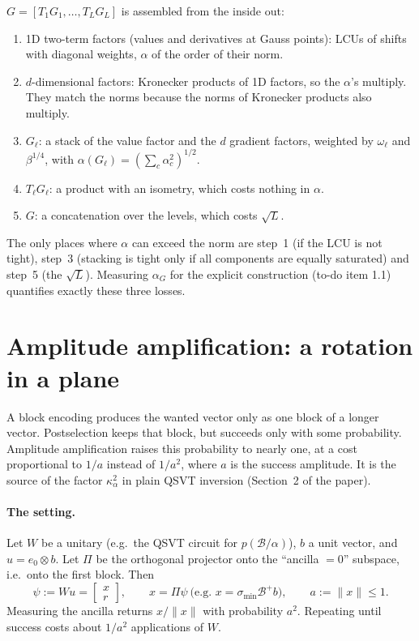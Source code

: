 \documentclass[11pt,a4paper]{article}
\newcommand{\B}{\mathcal{B}}
\begin{document}
$G=[T_1G_1,\dots,T_LG_L]$ is assembled from the inside out:
\begin{enumerate}
\item 1D two-term factors (values and derivatives at Gauss points): LCUs of
  shifts with diagonal weights, $\alpha$ of the order of their norm.
\item $d$-dimensional factors: Kronecker products of 1D factors, so the
  $\alpha$'s multiply. They match the norms because the norms of Kronecker
  products also multiply.
\item $G_\ell$: a stack of the value factor and the $d$ gradient factors, weighted
  by $\omega_\ell$ and $\beta^{1/4}$, with $\alpha(G_\ell)=(\sum_c\alpha_c^2)^{1/2}$.
\item $T_\ell G_\ell$: a product with an isometry, which costs nothing in $\alpha$.
\item $G$: a concatenation over the levels, which costs $\sqrt L$.
\end{enumerate}
The only places where $\alpha$ can exceed the norm are step~1 (if the LCU is
not tight), step~3 (stacking is tight only if all components are equally
saturated) and step~5 (the $\sqrt L$). Measuring $\alpha_G$ for the explicit
construction (to-do item 1.1) quantifies exactly these three losses.

\section{Amplitude amplification: a rotation in a plane}\label{sec:aa}

A block encoding produces the wanted vector only as one block of a longer
vector. Postselection keeps that block, but succeeds only with some
probability. Amplitude amplification raises this probability to nearly one,
at a cost proportional to $1/a$ instead of $1/a^2$, where $a$ is the success
amplitude. It is the source of the factor $\kappa_\alpha^2$ in plain QSVT
inversion (Section~2 of the paper).

\paragraph{The setting.} Let $W$ be a unitary (e.g.\ the QSVT circuit for
$p(\B/\alpha)$), $b$ a unit vector, and $u=e_0\otimes b$. Let $\Pi$ be the orthogonal
projector onto the ``ancilla $=0$'' subspace, i.e.\ onto the first block. Then
\[
\psi:=Wu=\begin{bmatrix}x\\ r\end{bmatrix},\qquad x=\Pi\psi\ \text{(e.g.\ }x=\sigma_{\min}\B^+b),\qquad a:=\|x\|\le1 .
\]
Measuring the ancilla returns $x/\|x\|$ with probability $a^2$. Repeating until
success costs about $1/a^2$ applications of $W$.
\end{document}
